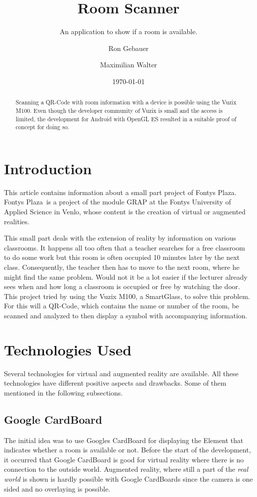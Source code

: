 \documentclass[11pt]{scrartcl}
\title{Room Scanner}
\subtitle{An application to show if a room is available.}
\author{Ron Gebauer \and Maximilian Walter}
\date{\today}
\begin{document}
\maketitle
\nocite{*}
\begin{abstract}
	Scanning a QR-Code with room information with a device is possible using the Vuzix M100. Even though the developer community of Vuzix is small and the access is limited, the development for Android with OpenGL ES resulted in a suitable proof of concept for doing so. 
\end{abstract}

\begin{multicols}{2}
	\section{Introduction}
	This article contains information about a small part project of \glqq Fontys Plaza\grqq. \glqq Fontys Plaza\grqq\ is a project of the module GRAP at the Fontys University of Applied Science in Venlo, whose content is the creation of virtual or augmented realities.
	
	This small part deals with the extension of reality by information on various classrooms. It happens all too often that a teacher searches for a free classroom to do some work but this room is often occupied 10 minutes later by the next class. Consequently, the teacher then has to move to the next room, where he might find the same problem. Would not it be a lot easier if the lecturer already sees when and how long a classroom is occupied or free by watching the door.
	This project tried by using the Vuzix M100, a SmartGlass, to solve this problem. For this will a QR-Code, which contains the name or number of the room, be scanned and analyzed to then display a symbol with accompanying information.
	
	\section{Technologies Used}
	Several technologies for virtual and augmented reality are available. All these technologies have different positive aspects and drawbacks. Some of them mentioned in the following subsections.
		\subsection{Google CardBoard}
			The initial idea was to use Googles CardBoard for displaying the Element that indicates whether a room is available or not. Before the start of the development, it occurred that Google CardBoard is good for virtual reality where there is no connection to the outside world. Augmented reality, where still a part of the \emph{real world} is shown is hardly possible with Google CardBoards since the camera is one sided and no overlaying is possible.
	

\end{multicols}
\end{document}
